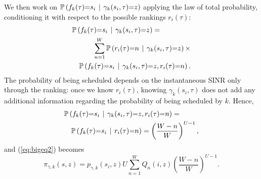 \documentclass[draftcls,onecolumn]{IEEEtran}
\theoremstyle{plain}
\theoremstyle{definition}
\begin{document}
We then work on $\mathbb{{P}}\left( f_k(\tau){=}s_i \hspace{4pt} \middle | \hspace{4 pt} \gamma_k(s_i,\tau) {=}z \right)$ applying the law of total probability, conditioning it with respect to the possible rankings $r_i(\tau)$:
\begin{eqnarray}
  \lefteqn{\mathbb{{P}}\left( f_k(\tau){=}s_i \hspace{4pt} \middle | \hspace{4 pt} \gamma_k(s_i,\tau) {=}z \right)=} \notag \\
&&\displaystyle \sum_{n=1}^{W} \mathbb{{P}}\left( r_i(\tau){=}n \hspace{4pt} \middle | \hspace{4 pt} \gamma_{k}(s_i,\tau){=}z \right) \times \notag \\
&&\mathbb{{P}}\left(f_k(\tau){=}s_i \hspace{4pt} \middle | \hspace{4 pt} \gamma_{k}(s_i,\tau){=}z , r_i(\tau){=}n  \right).
\end{eqnarray}
The probability of being scheduled depends on the instantaneous SINR only through the ranking: once we know $r_i(\tau)$, knowing $\gamma_{k}(s_i,\tau)$ does not add any additional information regarding the probability of being scheduled by $k$.
Hence, 
\begin{eqnarray}
\lefteqn{\mathbb{{P}}\left(f_k(\tau){=}s_i \hspace{4pt} \middle | \hspace{4 pt} \gamma_{k}(s_i,\tau){=}z , r_i(\tau){=}n  \right)=} \notag \\
&& \mathbb{{P}}\left(f_k(\tau){=}s_i \hspace{4pt} \middle | \hspace{4 pt} r_i(\tau){=}n  \right)=\left(\frac{W-n}{W}\right)^{U-1},
\end{eqnarray}
and (\ref{eq:bigeq2}) becomes
\begin{equation}
    \pi_{\gamma,k}(s,z)= p_{\gamma,k}(s_i,z) U \displaystyle \sum_{n=1}^{W} Q_n(i,z) \left(\frac{W-n}{W}\right)^{U-1}.
\end{equation}
\end{document}
